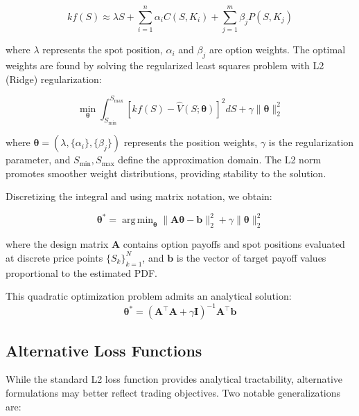 \documentclass[12pt]{article}
\DeclareMathOperator*{\argmin}{arg\,min}
\begin{document}
\begin{equation}
k f(S) \approx \lambda S + 
    \sum_{i=1}^{n} \alpha_i C(S, K_i) + 
    \sum_{j=1}^{m} \beta_j P(S, K_j)
\end{equation}

where \( \lambda \) represents the spot position, \( \alpha_i \) and \( \beta_j \) 
are option weights. The optimal weights are found by solving the regularized least 
squares problem with L2 (Ridge) regularization:

\begin{equation}
\min_{\boldsymbol{\theta}} 
    \int_{S_{\min}}^{S_{\max}} 
        \left[ k f(S) - \hat{V}(S;\boldsymbol{\theta}) \right]^2 dS + 
    \gamma \|\boldsymbol{\theta}\|_2^2
\end{equation}

where \( \boldsymbol{\theta} = (\lambda, \{\alpha_i\}, \{\beta_j\}) \) represents
the position weights, \( \gamma \) is the regularization parameter, and 
\( S_{\min}, S_{\max} \) define the approximation domain. The L2 norm promotes 
smoother weight distributions, providing stability to the solution.

Discretizing the integral and using matrix notation, we obtain:

\begin{equation}
\boldsymbol{\theta}^* = 
    \argmin_{\boldsymbol{\theta}} 
        \|\mathbf{A}\boldsymbol{\theta} - \mathbf{b}\|_2^2 + 
        \gamma \|\boldsymbol{\theta}\|_2^2
\end{equation}

where the design matrix \( \mathbf{A} \) contains option payoffs and spot positions
evaluated at discrete price points \( \{S_k\}_{k=1}^N \), and \( \mathbf{b} \) is
the vector of target payoff values proportional to the estimated PDF.

This quadratic optimization problem admits an analytical solution:
\begin{equation}
\boldsymbol{\theta}^* = 
    (\mathbf{A}^\top \mathbf{A} + \gamma \mathbf{I})^{-1} 
    \mathbf{A}^\top \mathbf{b}
\end{equation}

\subsection{Alternative Loss Functions}
While the standard L2 loss function provides analytical tractability, alternative 
formulations may better reflect trading objectives. Two notable generalizations are:
\end{document}
